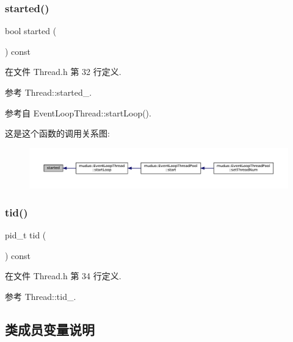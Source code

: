 \subsubsection{\texorpdfstring{started()}{started()}}
{\footnotesize\ttfamily bool started (\begin{DoxyParamCaption}{ }\end{DoxyParamCaption}) const\hspace{0.3cm}{\ttfamily [inline]}}



在文件 Thread.\+h 第 32 行定义.



参考 Thread\+::started\+\_\+.



参考自 Event\+Loop\+Thread\+::start\+Loop().

这是这个函数的调用关系图\+:
\nopagebreak
\begin{figure}[H]
\begin{center}
\leavevmode
\includegraphics[width=350pt]{classmuduo_1_1Thread_ae64a8595ddd43477f87ff91d9f051058_icgraph}
\end{center}
\end{figure}
\mbox{\label{classmuduo_1_1Thread_a1cab09936ca9d7d85a156634a27f8be4}} 
\subsubsection{\texorpdfstring{tid()}{tid()}}
{\footnotesize\ttfamily pid\+\_\+t tid (\begin{DoxyParamCaption}{ }\end{DoxyParamCaption}) const\hspace{0.3cm}{\ttfamily [inline]}}



在文件 Thread.\+h 第 34 行定义.



参考 Thread\+::tid\+\_\+.



\subsection{类成员变量说明}
\mbox{\label{classmuduo_1_1Thread_a8d48c0bb2a39f7e2f47bcdb994b1ffa5}} 

